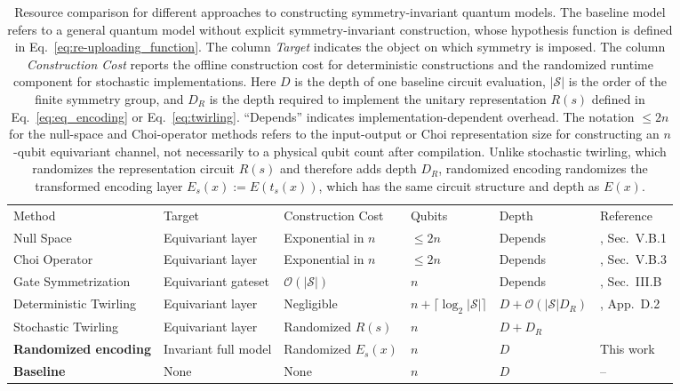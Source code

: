 \documentclass[%
 reprint,
 amsmath,amssymb,
 aps,
 pra,
]{revtex4-2}
\theoremstyle{definition}
\begin{document}
\begin{table}[t]
\begin{ruledtabular}
\begin{tabular}{llllll}
\textrm{Method} &\textrm{Target}&
\textrm{Construction Cost}&
\textrm{Qubits}&
\textrm{Depth}&
\textrm{Reference}\\ \colrule

Null Space &Equivariant layer& Exponential in \(n\)& \(\leq 2n\)& Depends& \cite{Nguyen2024}, Sec.~V.B.1\\

Choi Operator
 &Equivariant layer& Exponential in \(n\)& \(\leq 2n\)& Depends& \cite{Nguyen2024}, Sec.~V.B.3\\

Gate Symmetrization  &Equivariant gateset& \(\mathcal O(|\mathcal S|)\)& \(n\)& Depends& \cite{Meyer2023}, Sec.~III.B\\

Deterministic Twirling &Equivariant layer& Negligible& \(n+\lceil \log_2|\mathcal{S}| \rceil\)& \(D+\mathcal{O}(|\mathcal{S}|D_R)\)& \multirow{2}{*}{\cite{Nguyen2024}, App.~D.2}\\

Stochastic Twirling
 &Equivariant layer& Randomized $R(s)$& \(n\)
& \(D+D_R\)& \\

\textbf{Randomized encoding}
 &Invariant full model& Randomized $E_s(x)$& \(n\)
& \(D\)& This work\\
\textbf{Baseline} &None& None& \(n\)& \(D\)&--\\

\end{tabular}
\end{ruledtabular}
\caption{\label{tab:resource_complexity}
Resource comparison for different approaches to constructing symmetry-invariant quantum models.
The baseline model refers to a general quantum model without explicit symmetry-invariant construction, whose hypothesis function is defined in Eq.~\eqref{eq:re-uploading_function}.
The column \emph{Target} indicates the object on which symmetry is imposed.
The column \emph{Construction Cost} reports the offline construction cost for deterministic constructions and the randomized runtime component for stochastic implementations.
Here \(D\) is the depth of one baseline circuit evaluation, \(|\mathcal S|\) is the order of the finite symmetry group, and \(D_R\) is the depth required to implement the unitary representation \(R(s)\) defined in Eq.~\eqref{eq:eq_encoding} or Eq.~\eqref{eq:twirling}.
``Depends'' indicates implementation-dependent overhead.
The notation \(\leq 2n\) for the null-space and Choi-operator methods refers to the input-output or Choi representation size for constructing an \(n\)-qubit equivariant channel, not necessarily to a physical qubit count after compilation.
Unlike stochastic twirling, which randomizes the representation circuit \(R(s)\) and therefore adds depth \(D_R\), randomized encoding randomizes the transformed encoding layer \(E_s(x):=E(t_s(x))\), which has the same circuit structure and depth as \(E(x)\).
}
\end{table}
\end{document}
